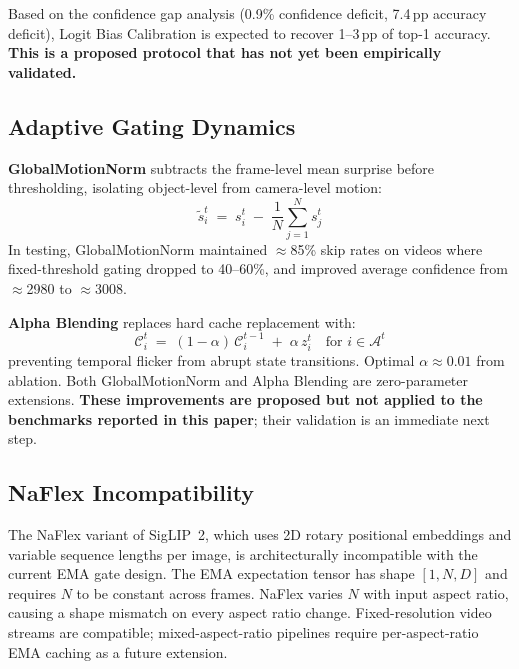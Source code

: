 \documentclass{article}
\begin{document}
Based on the confidence gap analysis (0.9\% confidence deficit, 7.4\,pp
accuracy deficit), Logit Bias Calibration is expected to recover 1--3\,pp
of top-1 accuracy. \textbf{This is a proposed protocol that has not yet
been empirically validated.}

\subsection{Adaptive Gating Dynamics}
\label{sec:fw-adaptive-gating}

\textbf{GlobalMotionNorm} subtracts the frame-level mean surprise before
thresholding, isolating object-level from camera-level motion:
\begin{equation}
\label{eq:global-norm}
\tilde{s}_i^t \;=\; s_i^t \;-\; \frac{1}{N}\sum_{j=1}^{N} s_j^t
\end{equation}
In testing, GlobalMotionNorm maintained $\approx$85\% skip rates on
videos where fixed-threshold gating dropped to 40--60\%, and improved
average confidence from $\approx$2980 to $\approx$3008.

\textbf{Alpha Blending} replaces hard cache replacement with:
\begin{equation}
\label{eq:alpha-blend}
\mathcal{C}_i^t \;=\; (1 - \alpha)\,\mathcal{C}_i^{t-1}
\;+\; \alpha\, z_i^t \quad \text{for } i \in \mathcal{A}^t
\end{equation}
preventing temporal flicker from abrupt state transitions. Optimal
$\alpha \approx 0.01$ from ablation. Both GlobalMotionNorm and Alpha
Blending are zero-parameter extensions. \textbf{These improvements are
proposed but not applied to the benchmarks reported in this paper};
their validation is an immediate next step.

\subsection{NaFlex Incompatibility}
\label{naflex-incompatibility}

The NaFlex variant of SigLIP~2, which uses 2D rotary positional embeddings
and variable sequence lengths per image, is architecturally incompatible
with the current EMA gate design. The EMA expectation tensor has shape
$[1, N, D]$ and requires $N$ to be constant across frames. NaFlex varies
$N$ with input aspect ratio, causing a shape mismatch on every aspect ratio
change. Fixed-resolution video streams are compatible; mixed-aspect-ratio
pipelines require per-aspect-ratio EMA caching as a future extension.
\end{document}
